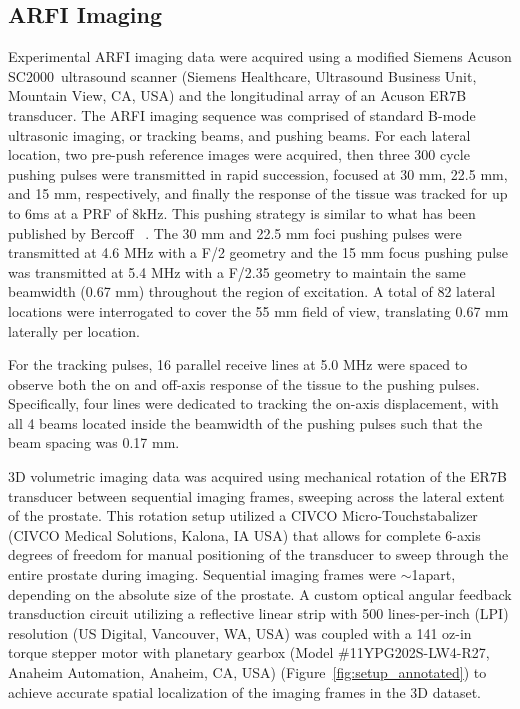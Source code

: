 \subsection{ARFI Imaging}
Experimental ARFI imaging data were acquired using a modified Siemens Acuson
SC2000\texttrademark~ultrasound scanner (Siemens Healthcare, Ultrasound Business Unit,
Mountain View, CA, USA) and the longitudinal array of an Acuson ER7B
transducer.  The ARFI imaging sequence was comprised of
standard B-mode ultrasonic imaging, or tracking beams, and pushing beams. For
each lateral location, two pre-push reference images were acquired, then three
300 cycle pushing pulses were transmitted in rapid succession, focused at 30
mm, 22.5 mm, and 15 mm, respectively, and finally the response of the tissue
was tracked for up to 6ms at a PRF of 8kHz. This pushing strategy is similar to
what has been published by Bercoff \etal~\cite{Bercoff2004}. The 30 mm and 22.5
mm foci pushing pulses were transmitted at 4.6 MHz with a F/2 geometry and the
15 mm focus pushing pulse was transmitted at 5.4 MHz with a F/2.35 geometry to
maintain the same beamwidth (0.67 mm) throughout the region of excitation. A
total of 82 lateral locations were interrogated to cover the 55 mm field of
view, translating 0.67 mm laterally per location.

For the tracking pulses, 16 parallel receive lines at 5.0 MHz were spaced to
observe both the on and off-axis response of the tissue to the pushing pulses.
Specifically, four lines were dedicated to tracking the on-axis displacement,
with all 4 beams located inside the beamwidth of the pushing pulses such that
the beam spacing was 0.17 mm. 

3D volumetric imaging data was acquired using mechanical rotation of the ER7B
transducer between sequential imaging frames, sweeping across the lateral
extent of the prostate.  This rotation setup utilized a CIVCO
Micro-Touch\texttrademark stabalizer (CIVCO Medical Solutions, Kalona, IA USA)
that allows for complete 6-axis degrees of freedom for manual positioning of
the transducer to sweep through the entire prostate during imaging.  Sequential
imaging frames were $\sim$1\degree apart, depending on the absolute size of the
prostate.  A custom optical angular feedback transduction circuit utilizing a
reflective linear strip with 500 lines-per-inch (LPI) resolution (US Digital,
Vancouver, WA, USA) was coupled with a 141 oz-in torque stepper motor with
planetary gearbox (Model \#11YPG202S-LW4-R27, Anaheim Automation, Anaheim, CA,
USA) (Figure~\ref{fig:setup_annotated}) to achieve accurate spatial
localization of the imaging frames in the 3D dataset.

